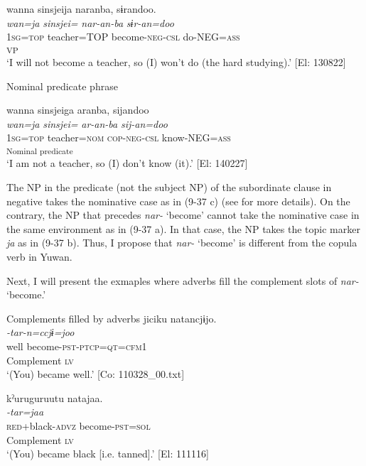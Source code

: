 \ex \label{ex:9.37b} %
    \gllll  wanna  sinsjeija  naranba,  sɨrandoo.\\
       \textit{wan=ja}  \textit{sinsjei=}  \textit{nar-an-ba}  \textit{sɨr-an=doo}\\
       1\textsc{sg}=\textsc{top}  teacher=TOP  become-\textsc{neg}-\textsc{csl}  do-NEG=\textsc{ass}\\
        [Complement  \textsc{lv}]\textsubscript{VP}  \\
      \glt        ‘I will not become a teacher, so (I) won’t do (the hard studying).’ [El: 130822]

\exi{}  Nominal predicate phrase

\ex \label{ex:9.37c} %
    \gllll  wanna  sinsjeiga  aranba,  sijandoo\\
       \textit{wan=ja}  \textit{sinsjei=}  \textit{ar-an-ba}  \textit{sij-an=doo}\\
       1\textsc{sg}=\textsc{top}  teacher=\textsc{nom}  \textsc{cop}-\textsc{neg}-\textsc{csl}  know-NEG=\textsc{ass}\\
        [NP  Copula verb]\textsubscript{Nominal predicate}  \\
      \glt        ‘I am not a teacher, so (I) don’t know (it).’ [El: 140227]
    \z
\z

The NP in the predicate (not the subject NP) of the subordinate clause in negative takes the nominative case as in (9-37 c) (see  for more details). On the contrary, the NP that precedes \textit{nar-} ‘become’ cannot take the nominative case in the same environment as in (9-37 a). In that case, the NP takes the topic marker \textit{ja} as in (9-37 b). Thus, I propose that \textit{nar-} ‘become’ is different from the copula verb in Yuwan.

  Next, I will present the exmaples where adverbs fill the complement slots of \textit{nar-} ‘become.’

\ea   Complements filled by adverbs \label{ex:9.38}
\ea \label{ex:9.38a}%
 \gllll  jiciku  natancjɨjo.\\
      \textit{}  \textit{-tar-n=ccjɨ=joo}\\
      well  become-\textsc{pst}-\textsc{ptcp}=\textsc{qt}=\textsc{cfm}1\\
      Complement  \textsc{lv}\\
      \glt       ‘(You) became well.’ [Co: 110328\_00.txt]

\ex \label{ex:9.38b} %
    \gllll  kˀuruguruutu  natajaa.  \\
      \textit{}  \textit{-tar=jaa} \\
      \textsc{red}+black-\textsc{advz}  become-\textsc{pst}=\textsc{sol}  \\
      Complement  \textsc{lv}  \\
      \glt       ‘(You) became black [i.e. tanned].’ [El: 111116]
    \z
\z

